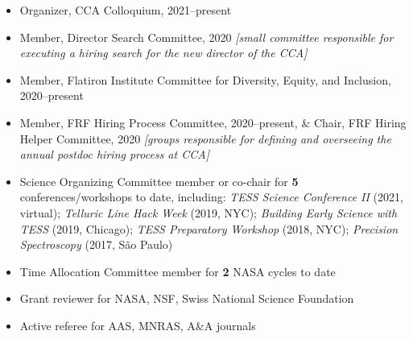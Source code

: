 \documentclass{clean_cv}
\begin{document}
\begin{itemize}
    \item Organizer, CCA Colloquium, 2021--present
    \item Member, Director Search Committee, 2020 \textit{[small committee responsible for executing a hiring search for the new director of the CCA]}
    \item Member, Flatiron Institute Committee for Diversity, Equity, and Inclusion, 2020--present
    \item Member, FRF Hiring Process Committee, 2020--present, \& Chair, FRF Hiring Helper Committee, 2020 \textit{[groups responsible for defining and overseeing the annual postdoc hiring process at CCA]}
    \item Science Organizing Committee member or co-chair for \textbf{5} conferences/workshops to date, including: \textit{TESS Science Conference II} (2021, virtual); \textit{Telluric Line Hack Week} (2019, NYC); \textit{Building Early Science with TESS} (2019, Chicago); \textit{TESS Preparatory Workshop} (2018, NYC); \textit{Precision Spectroscopy} (2017, S\~{a}o Paulo)
    \item Time Allocation Committee member for \textbf{2} NASA cycles to date
    \item Grant reviewer for NASA, NSF, Swiss National Science Foundation
    \item Active referee for AAS, MNRAS, A\&A journals
\end{itemize}
\end{document}
